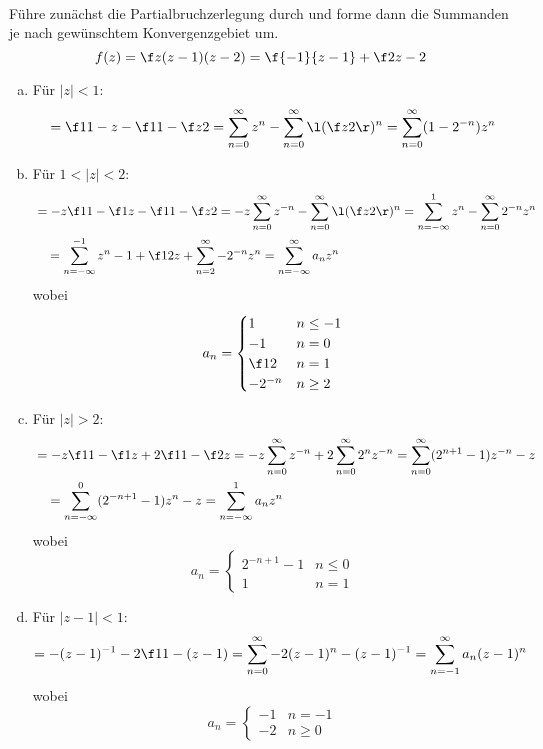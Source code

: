 \documentclass{mywork}
\begin{document}
	\setcounter{section}{6}

	\begin{aufgabe}~

		Führe zunächst die Partialbruchzerlegung durch und forme dann die Summanden je nach gewünschtem Konvergenzgebiet um.
		\[
			f(z)
			= \f z{(z-1)(z-2)}
			= \f {-1}{z-1} + \f 2{z-2}
		\]

		\begin{enumerate}[(a)]
			\item
				Für $|z|<1$:
				\[
					= \f 1{1-z} - \f 1{1-\f z2} 
					= \sum_{n=0}^\infty z^n - \sum_{n=0}^\infty \l(\f z2\r)^n
					= \sum_{n=0}^\infty (1-2^{-n}) z^n
				\]
			\item
				Für $1<|z|<2$:
				\begin{align*}
					&= -z \f 1{1-\f 1z} - \f 1{1-\f z2}
					= -z \sum_{n=0}^\infty z^{-n} - \sum_{n=0}^\infty \l(\f z2\r)^n 
					= \sum_{n=-\infty}^1 z^n - \sum_{n=0}^\infty 2^{-n} z^n \\
					&\quad = \sum_{n=-\infty}^{-1} z^n - 1 + \f 12 z + \sum_{n=2}^\infty -2^{-n} z^n
					= \sum_{n=-\infty}^\infty a_n z^n
				\end{align*}
				wobei
				\[
					a_n = \begin{cases}
						1 & n \le -1\\
						-1 & n = 0 \\
						\f 12 & n = 1 \\
						-2^{-n} & n \ge 2
					\end{cases}
				\]
			\item
				Für $|z|>2$:
				\begin{align*}
					&= -z \f 1{1-\f 1z} + 2 \f 1{1-\f 2z}
					= -z \sum_{n=0}^\infty z^{-n} + 2 \sum_{n=0}^\infty 2^n z^{-n}
					= \sum_{n=0}^\infty ( 2^{n+1} - 1) z^{-n} - z \\
					&\quad = \sum_{n=-\infty}^0 (2^{-n+1} -1) z^n - z
					= \sum_{n=-\infty}^1 a_n z^n
				\end{align*}
				wobei
				\[
					a_n = \begin{cases}
						2^{-n+1}-1 & n\le 0\\
						1 & n=1
					\end{cases}
				\]
			\item
				Für $|z-1|<1$:
				\begin{align*}
					= -(z-1)^{-1} - 2 \f 1{1-(z-1)}
					= \sum_{n=0}^\infty -2(z-1)^n - (z-1)^{-1}
					= \sum_{n=-1}^\infty a_n (z-1)^n
				\end{align*}
				wobei
				\[
					a_n = \begin{cases}
						-1 & n = -1 \\
						-2 & n \ge 0
					\end{cases}
				\]
		\end{enumerate}
	\end{aufgabe}
\end{document}
